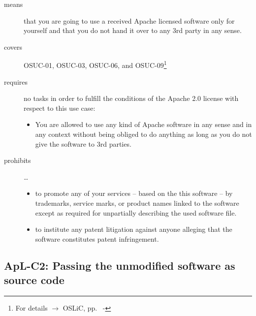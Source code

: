 \begin{description}

\item[means] that you are going to use a received Apache licensed software only
for yourself and that you do not hand it over to any 3rd party in any sense.

\item[covers] OSUC-01, OSUC-03, OSUC-06, and OSUC-09\footnote{For details 
$\rightarrow$ OSLiC, pp.\ \pageref{OSUC-01-DEF} - \pageref{OSUC-09-DEF}}

\item[requires] no tasks in order to fulfill the conditions of the Apache 2.0
license with respect to this use case:
  \begin{itemize}
    \item You are allowed to use any kind of Apache software in any sense and in
    any context without being obliged to do anything as long as you do not
    give the software to 3rd parties.
  \end{itemize}
  
\item[prohibits] \ldots
\begin{itemize}
  \item to promote any of your services – based on the this software – by
  trademarks, service marks, or product names linked to the software except as
  required for unpartially describing the used software file.
  \item to institute any patent litigation against anyone alleging that the
  software constitutes patent infringement.
\end{itemize}

\end{description}

\subsection{ApL-C2: Passing the unmodified software as source code}
\label{OSUC-02S-Apache20} \label{OSUC-05S-Apache20} \label{OSUC-07S-Apache20} 

